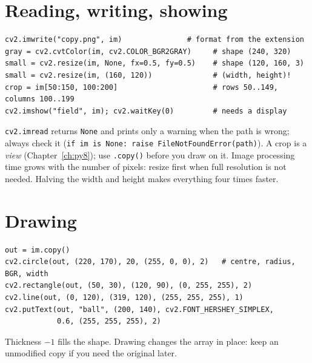 \section*{Reading, writing, showing}
\begin{verbatim}
cv2.imwrite("copy.png", im)               # format from the extension
gray = cv2.cvtColor(im, cv2.COLOR_BGR2GRAY)     # shape (240, 320)
small = cv2.resize(im, None, fx=0.5, fy=0.5)    # shape (120, 160, 3)
small = cv2.resize(im, (160, 120))              # (width, height)!
crop = im[50:150, 100:200]                      # rows 50..149, columns 100..199
cv2.imshow("field", im); cv2.waitKey(0)         # needs a display
\end{verbatim}
\texttt{cv2.imread} returns \texttt{None} and prints only a warning when the path is wrong; always check it (\verb!if im is None: raise FileNotFoundError(path)!). A crop is a \emph{view} (Chapter~\ref{ch:py8}); use \texttt{.copy()} before you draw on it. Image processing time grows with the number of pixels: resize first when full resolution is not needed. Halving the width and height makes everything four times faster.

\section*{Drawing}
\begin{verbatim}
out = im.copy()
cv2.circle(out, (220, 170), 20, (255, 0, 0), 2)   # centre, radius, BGR, width
cv2.rectangle(out, (50, 30), (120, 90), (0, 255, 255), 2)
cv2.line(out, (0, 120), (319, 120), (255, 255, 255), 1)
cv2.putText(out, "ball", (200, 140), cv2.FONT_HERSHEY_SIMPLEX,
            0.6, (255, 255, 255), 2)
\end{verbatim}
Thickness $-1$ fills the shape. Drawing changes the array in place: keep an unmodified copy if you need the original later.

